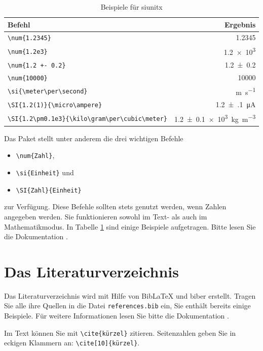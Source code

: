 \begin{table}[!h]
    \centering
    \caption{Beispiele für siunitx}
    \label{tab:si}
    \begin{tabular}{l r}
        \toprule
        Befehl     &   Ergebnis \\
        \midrule
        \verb+\num{1.2345}+ & \num{1.2345} \\
        \verb+\num{1.2e3}+ & \num{1.2e3} \\
        \verb_\num{1.2 +- 0.2}_ & \num{1.2+-0.2} \\
        \verb+\num{10000}+ & \num{10000} \\
        \verb+\si{\meter\per\second}+ & \si{\meter\per\second} \\
        \verb+\SI{1.2(1)}{\micro\ampere}+ & \SI{1.2(1)}{\micro\ampere} \\
        \verb+\SI{1.2\pm0.1e3}{\kilo\gram\per\cubic\meter}+ & \SI{1.2\pm0.1e3}{\kilo\gram\per\cubic\meter} \\
        \bottomrule 
    \end{tabular}
\end{table}

Das Paket stellt unter anderem die drei wichtigen Befehle
\begin{itemize}
    \item \texttt{\textbackslash num\{Zahl\}},
    \item \texttt{\textbackslash si\{Einheit\}} und
    \item \texttt{\textbackslash SI\{Zahl\}\{Einheit\}}
\end{itemize}
zur Verfügung.
Diese Befehle sollten stets genutzt werden, wenn Zahlen angegeben werden. 
Sie funktionieren sowohl im Text- als auch im Mathematikmodus.
In Tabelle \ref{tab:si} sind einige Beispiele aufgetragen. Bitte lesen Sie die Dokumentation \cite{siunitx}.

\section{Das Literaturverzeichnis}

Das Literaturverzeichnis wird mit Hilfe von BibLaTeX und biber erstellt.
Tragen Sie alle ihre Quellen in die Datei \texttt{references.bib} ein, Sie enthält bereits
einige Beispiele. Für weitere Informationen lesen Sie bitte die Dokumentation \cite{biblatex}.

Im Text können Sie mit \verb_\cite{kürzel}_ zitieren. Seitenzahlen geben Sie in eckigen Klammern an:
\verb_\cite[10]{kürzel}_. 

